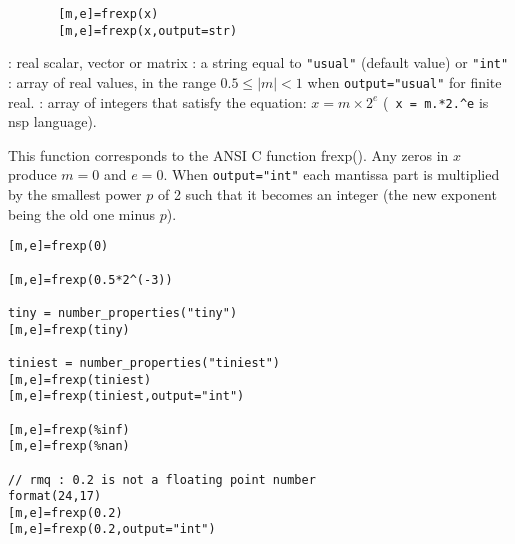 

\begin{mandesc}
\end{mandesc}


\begin{calling_sequence}
    \begin{verbatim}
       [m,e]=frexp(x)  
       [m,e]=frexp(x,output=str)  
    \end{verbatim}
\end{calling_sequence}


\begin{parameters}
  \begin{varlist}
   : real scalar, vector or matrix
   : a string equal to \verb+"usual"+ (default value) or  \verb+"int"+
   : array of real values, in the range $0.5 \le |m| < 1$ when \verb+output="usual"+
              for finite real. 
   : array of integers that satisfy the equation: $x = m
   \times 2^e$ (\verb+ x = m.*2.^e+ is nsp language).
  \end{varlist}
\end{parameters}

\begin{mandescription}
    This function corresponds to the ANSI C function frexp().
  Any zeros in $x$ produce $m=0$ and $e=0$. When \verb+output="int"+ each
  mantissa part is multiplied by the smallest power $p$ of 2 such that it becomes
  an integer (the new exponent being the old one minus $p$).
\end{mandescription}


\begin{examples}

\begin{Verbatim}
[m,e]=frexp(0)

[m,e]=frexp(0.5*2^(-3))

tiny = number_properties("tiny")
[m,e]=frexp(tiny)

tiniest = number_properties("tiniest")
[m,e]=frexp(tiniest)
[m,e]=frexp(tiniest,output="int")

[m,e]=frexp(%inf)
[m,e]=frexp(%nan)

// rmq : 0.2 is not a floating point number
format(24,17)
[m,e]=frexp(0.2)
[m,e]=frexp(0.2,output="int")
\end{Verbatim}

\end{examples}


\begin{manseealso}
\end{manseealso}

